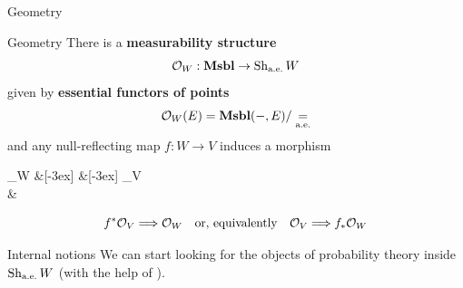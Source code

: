 {
	\begin{frame}{Geometry}
	\end{frame}
}

\begin{frame}{Geometry}
	There is a \textbf{measurability structure}
	\begin{equation*}
		\mathcal{O}_W : \mathbf{Msbl} \to \operatorname{Sh}_{\text{a.e.}} W
	\end{equation*}
	given by \textbf{essential functors of points}
	\begin{equation*}
		\mathcal{O}_W(E) = \mathbf{Msbl}(-, E) / \underset{\text{a.e.}}{=}
	\end{equation*}
	and any null-reflecting map $f : W \to V$ induces a morphism
	\begin{diagram*}
		\Sh_\aetop W \&[-3ex] \&[-3ex] \Sh_\aetop V\\
		\& \Msbl
		\arrow[""{name=0, anchor=center, inner sep=0}, "{f_*}"', shift right=2, from=1-1, to=1-3]
		\arrow[""{name=1, anchor=center, inner sep=0}, "{f^*}"', shift right=2, from=1-3, to=1-1]
		\arrow["{\O_W}", from=2-2, to=1-1]
		\arrow[""{name=2, anchor=center, inner sep=0}, "{\O_V}"', from=2-2, to=1-3]
		\arrow["\dashv"{anchor=center, rotate=-90}, draw=none, from=1, to=0]
		\arrow[shorten <=20pt, shorten >=30pt, shift left=2, Rightarrow, from=2, to=1-1]
	\end{diagram*}
	\begin{equation*}
		f^*\mathcal{O}_V \Longrightarrow \mathcal{O}_W \quad\text{or, equivalently}\quad \mathcal{O}_V \Longrightarrow f_*\mathcal{O}_W
	\end{equation*}
\end{frame}

\begin{frame}{Internal notions}
	We can start looking for the objects of probability theory inside $\operatorname{Sh}_{\text{a.e.}} W$ (with the help of \cite{jackson2006sheaf}).
\end{frame}

